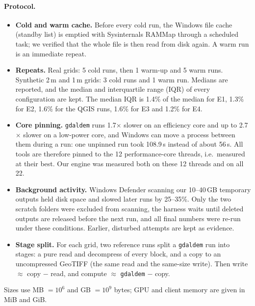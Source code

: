 \documentclass[11pt,a4paper]{article}
\begin{document}
\paragraph{Protocol.}
\begin{itemize}
  \item \textbf{Cold and warm cache.} Before every cold run, the Windows file cache (standby list) is emptied with
  Sysinternals RAMMap through a scheduled task; we verified that the whole file is then read from disk again. A warm
  run is an immediate repeat.
  \item \textbf{Repeats.} Real grids: 5 cold runs, then 1 warm-up and 5 warm runs. Synthetic 2\,m and 1\,m grids:
  3 cold runs and 1 warm run. Medians are reported, and the median and interquartile range (IQR) of every
  configuration are kept. The median IQR is 1.4\% of the median for E1, 1.3\% for E2, 1.6\% for the QGIS runs,
  1.6\% for E3 and 1.2\% for E4.
  \item \textbf{Core pinning.} \texttt{gdaldem} runs 1.7$\times$ slower on an efficiency core and up to 2.7$\times$
  slower on a low-power core, and Windows can move a process between them during a run: one unpinned run took
  108.9\,s instead of about 56\,s. All tools are therefore pinned to the 12 performance-core threads, i.e.\ measured
  at their best. Our engine was measured both on these 12 threads and on all 22.
  \item \textbf{Background activity.} Windows Defender scanning our 10--40\,GB temporary outputs held disk space and
  slowed later runs by 25--35\%. Only the two scratch folders were excluded from scanning, the harness waits until
  deleted outputs are released before the next run, and all final numbers were re-run under these conditions.
  Earlier, disturbed attempts are kept as evidence.
  \item \textbf{Stage split.} For each grid, two reference runs split a \texttt{gdaldem} run into stages: a pure read
  and decompress of every block, and a copy to an uncompressed GeoTIFF (the same read and the same-size write).
  Then write $\approx$ copy $-$ read, and compute $\approx$ \texttt{gdaldem} $-$ copy.
\end{itemize}
Sizes use MB $=10^6$ and GB $=10^9$ bytes; GPU and client memory are given in MiB and GiB.
\end{document}
